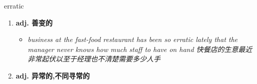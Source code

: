 
\begin{frame}
{\huge erratic}
\begin{center}
\begin{enumerate}\Large
  \item \textbf{adj. 善变的}
  \begin{itemize}
    \item \em{\Large{business at the fast-food restaurant has been so erratic lately that the manager never knows how much staff to have on hand 快餐店的生意最近非常起伏以至于经理也不清楚需要多少人手}}
  \end{itemize}
  \item \textbf{adj. 异常的,不同寻常的}
\end{enumerate}
\end{center}
\end{frame}
